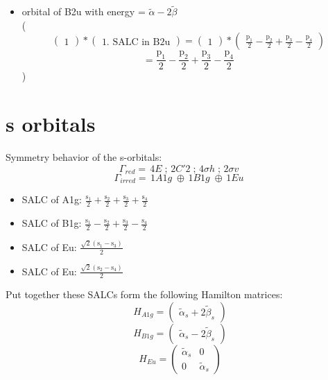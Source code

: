 \documentclass[12pt,a4paper]{article}
\begin{document}
\begin{itemize}
\item orbital of B2u with energy = 
                                $\tilde{\alpha} - 2 \tilde{\beta}$ \\
( 
$$
\begin{pmatrix}1\end{pmatrix} * \left(\begin{array}{c}\text{1. SALC in B2u}\end{array}\right) = \begin{pmatrix}1\end{pmatrix} * \begin{pmatrix}\frac{\text{p}_{1}}{2} - \frac{\text{p}_{2}}{2} + \frac{\text{p}_{3}}{2} - \frac{\text{p}_{4}}{2}\end{pmatrix} 
 $$ $$ = \frac{\text{p}_{1}}{2} - \frac{\text{p}_{2}}{2} + \frac{\text{p}_{3}}{2} - \frac{\text{p}_{4}}{2} 
 $$ 
 )

\end{itemize}



\newpage \section*{s orbitals}
Symmetry behavior of the s-orbitals:
$$\mathsf{\Gamma}_{red} = \,4 E\;; \,2 C'2\;; \,4 \sigma h\;; \,2 \sigma v\;$$
$$\mathsf{\Gamma}_{irred} = \,1 A1g\;\oplus{}\,1 B1g\;\oplus{}\,1 Eu\;$$


\begin{itemize}
\item SALC of A1g: \quad $\frac{\text{s}_{1}}{2} + \frac{\text{s}_{2}}{2} + \frac{\text{s}_{3}}{2} + \frac{\text{s}_{4}}{2}$
\item SALC of B1g: \quad $\frac{\text{s}_{1}}{2} - \frac{\text{s}_{2}}{2} + \frac{\text{s}_{3}}{2} - \frac{\text{s}_{4}}{2}$
\item SALC of Eu: \quad $\frac{\sqrt{2} \left(\text{s}_{1} - \text{s}_{3}\right)}{2}$
\item SALC of Eu: \quad $\frac{\sqrt{2} \left(\text{s}_{2} - \text{s}_{4}\right)}{2}$
\end{itemize}
Put together these SALCs form the following Hamilton matrices:
     $$ H_{A1g}= \begin{pmatrix}\tilde{\alpha}_{s} + 2 \tilde{\beta}_{s}\end{pmatrix}$$ 
     $$ H_{B1g}= \begin{pmatrix}\tilde{\alpha}_{s} - 2 \tilde{\beta}_{s}\end{pmatrix}$$ 
     $$ H_{Eu}= \begin{pmatrix}\tilde{\alpha}_{s} & 0\\0 & \tilde{\alpha}_{s}\end{pmatrix}$$ 
\end{document}
